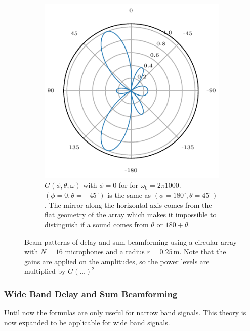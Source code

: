 \begin{figure}[ht]
\begin{subfigure}[t]{0.45\textwidth}
		\includegraphics[width=\textwidth]{images/3_source_localization/radial_1200_circ_theta_single.pdf}
		\caption{\(G(\phi, \theta, \omega)\) with $\phi = 0$ for for $\omega_0 = 2\pi 1000$.
			$(\phi= 0, \theta = -45^\circ)$ is the same as $(\phi= 180^\circ, \theta = 45^\circ)$.
			The mirror along the horizontal axis comes from the flat geometry of the array which makes
			it impossible to distinguish if a sound comes from $\theta$ or $180 + \theta$.}
		\label{ssl:fig:CircBmTheta}
	\end{subfigure}
	\caption{Beam patterns of delay and sum beamforming using a circular array with $N=16$ microphones
		and a radius $r = 0.25$\,m. Note that the gains are applied on the amplitudes, so the
		power levels are multiplied by $G(\dots)^2$}
	\label{ssl:fig:CircBmResponse}
\end{figure}

\subsubsection{Wide Band Delay and Sum Beamforming}
Until now the formulas are only useful for narrow band signals.
This theory is now expanded to be applicable for wide band signals.


